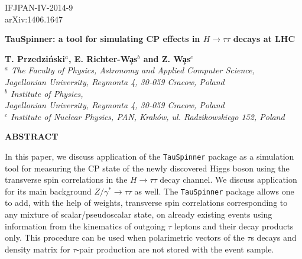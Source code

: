 \documentclass[12pt]{article}
\begin{document}
\begin{titlepage}
 
\begin{flushright} 
{ IFJPAN-IV-2014-9 \\ arXiv:1406.1647 } 
\end{flushright}

\vspace{0.2cm} 
\begin{center}

{\Huge \bf  TauSpinner: a tool for simulating CP effects in $ H \to \tau \tau$ decays at LHC }
\end{center}
\vspace*{5mm}

 

\begin{center}
   {\bf 
        T. Przedzi\'nski$^{a}$, E. Richter-W\c{a}s$^{b}$
 and Z. W\c{a}s$^{c}$  }\\
       {\em $^a$ The Faculty of Physics, Astronomy and Applied Computer Science, \\ 
Jagellonian University, Reymonta 4, 30-059 Cracow, Poland}\\
       {\em $^b$ Institute of Physics, \\ 
Jagellonian University, Reymonta 4, 30-059 Cracow, Poland}\\
       {\em $^c$  Institute of Nuclear Physics, PAN,
        Krak\'ow, ul. Radzikowskiego 152, Poland} 

\end{center}
\vspace{.1 cm}
\begin{center}
{\bf   ABSTRACT  }
\end{center} 

In this paper,
we discuss application of the  {\tt TauSpinner} package as a simulation tool
for  measuring the CP state of the newly discovered Higgs boson
using the transverse spin correlations in the $H \to \tau \tau$ decay channel.
We discuss application for its main background $Z/\gamma^* \to \tau \tau$ as well. 
The  {\tt TauSpinner}  package allows one to add, with the help of weights, 
transverse spin correlations 
corresponding to any mixture of scalar/pseudoscalar state,
on already existing events using information from the kinematics 
of outgoing $\tau$ leptons and their decay products only. 
This procedure can be used  when polarimetric vectors of the $\tau$s decays and 
density matrix for $\tau$-pair production are not stored with 
the  event sample.


\end{titlepage}
\end{document}
